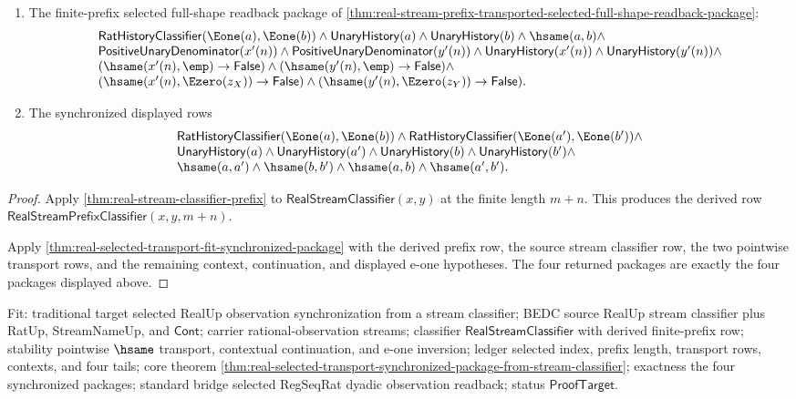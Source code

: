 \begin{theorem}
\begin{enumerate}
$$\begin{array}{l}
\hsame(a,a')\land
\hsame(b,b')\land
\hsame(a,b)\land
\hsame(a',b').
\end{array}
$$
\item The finite-prefix selected full-shape readback package of
\autoref{thm:real-stream-prefix-transported-selected-full-shape-readback-package}:
$$
\begin{array}{l}
\mathsf{RatHistoryClassifier}(\Eone(a),\Eone(b))\land
\mathsf{UnaryHistory}(a)\land \mathsf{UnaryHistory}(b)\land \hsame(a,b)\land\\
\mathsf{PositiveUnaryDenominator}(x'(n))\land
\mathsf{PositiveUnaryDenominator}(y'(n))\land
\mathsf{UnaryHistory}(x'(n))\land
\mathsf{UnaryHistory}(y'(n))\land\\
(\hsame(x'(n),\emp)\to\mathsf{False})\land
(\hsame(y'(n),\emp)\to\mathsf{False})\land\\
(\hsame(x'(n),\Ezero(z_X))\to\mathsf{False})\land
(\hsame(y'(n),\Ezero(z_Y))\to\mathsf{False}).
\end{array}
$$
\item The synchronized displayed rows
$$
\begin{array}{l}
\mathsf{RatHistoryClassifier}(\Eone(a),\Eone(b))\land
\mathsf{RatHistoryClassifier}(\Eone(a'),\Eone(b'))\land\\
\mathsf{UnaryHistory}(a)\land
\mathsf{UnaryHistory}(a')\land
\mathsf{UnaryHistory}(b)\land
\mathsf{UnaryHistory}(b')\land\\
\hsame(a,a')\land
\hsame(b,b')\land
\hsame(a,b)\land
\hsame(a',b').
\end{array}
$$
\end{enumerate}
\end{theorem}
\begin{proof}
Apply \autoref{thm:real-stream-classifier-prefix} to
$\mathsf{RealStreamClassifier}(x,y)$ at the finite length $m+n$. This produces
the derived row $\mathsf{RealStreamPrefixClassifier}(x,y,m+n)$.

Apply \autoref{thm:real-selected-transport-fit-synchronized-package} with the
derived prefix row, the source stream classifier row, the two pointwise
transport rows, and the remaining context, continuation, and displayed e-one
hypotheses. The four returned packages are exactly the four packages displayed
above.
\end{proof}

Fit: traditional target selected RealUp observation synchronization from a
stream classifier; BEDC source RealUp stream classifier plus RatUp,
StreamNameUp, and $\mathsf{Cont}$; carrier rational-observation streams;
classifier $\mathsf{RealStreamClassifier}$ with derived finite-prefix row;
stability pointwise $\hsame$ transport, contextual continuation, and e-one
inversion; ledger selected index, prefix length, transport rows, contexts, and
four tails; core theorem
\autoref{thm:real-selected-transport-synchronized-package-from-stream-classifier};
exactness the four synchronized packages; standard bridge selected RegSeqRat
dyadic observation readback; status $\mathsf{ProofTarget}$.

